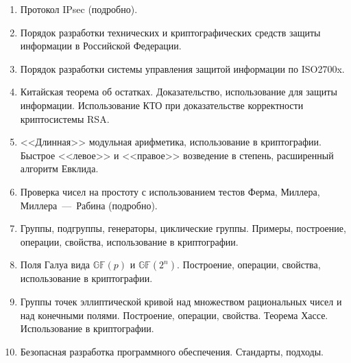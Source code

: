 \begin{enumerate}
    \item Протокол IPsec (подробно).
    \item Порядок разработки технических и криптографических средств защиты информации в Российской Федерации.
    \item Порядок разработки системы управления защитой информации по ISO2700x.
    \item Китайская теорема об остатках. Доказательство, использование для защиты информации. Использование КТО при доказательстве корректности криптосистемы RSA.
    \item <<Длинная>> модульная арифметика, использование в криптографии. Быстрое <<левое>> и <<правое>> возведение в степень, расширенный алгоритм Евклида.
    \item Проверка чисел на простоту с использованием тестов Ферма, Миллера, Миллера~---~Рабина (подробно).
    \item Группы, подгруппы, генераторы, циклические группы. Примеры, построение, операции, свойства, использование в криптографии.
    \item Поля Галуа вида $\mathbb{GF}(p)$ и $\mathbb{GF}(2^n)$. Построение, операции, свойства, использование в криптографии.
    \item Группы точек эллиптической кривой над множеством рациональных чисел и над конечными полями. Построение, операции, свойства. Теорема Хассе. Использование в криптографии.
    \item Безопасная разработка программного обеспечения. Стандарты, подходы.
\end{enumerate}
